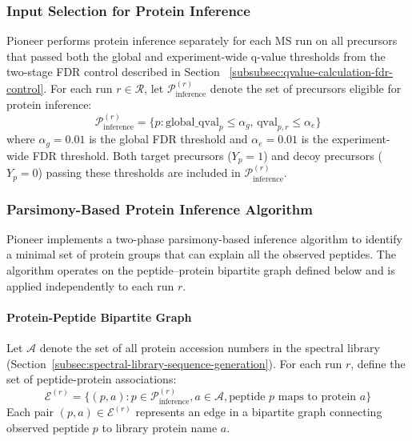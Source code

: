 \documentclass[pdflatex,sn-nature]{sn-jnl}
\begin{document}
\subsubsection{Input Selection for Protein Inference}\label{subsubsec:input-selection-protein-inference}

Pioneer performs protein inference separately for each MS run on all precursors that passed both the global and experiment-wide q-value thresholds from the two-stage FDR control described in Section~ \ref{subsubsec:qvalue-calculation-fdr-control}. For each run $r \in \mathcal{R}$, let $\mathcal{P}_{\text{inference}}^{(r)}$ denote the set of precursors eligible for protein inference:
\begin{equation}
\mathcal{P}_{\text{inference}}^{(r)} = \{p : \text{global\_qval}_p \leq \alpha_g, \, \text{qval}_{p,r} \leq \alpha_e\}
\end{equation}
where $\alpha_g = 0.01$ is the global FDR threshold and $\alpha_e = 0.01$ is the experiment-wide FDR threshold. Both target precursors ($Y_p = 1$) and decoy precursors ($Y_p = 0$) passing these thresholds are included in $\mathcal{P}_{\text{inference}}^{(r)}$.


\subsubsection{Parsimony-Based Protein Inference
Algorithm}\label{subsubsec:parsimony-based-protein-inference}

Pioneer implements a two-phase parsimony-based inference algorithm
\cite{Nesvizhskii2005-oj,Zhang2007-jo} to identify a minimal set of protein groups that can explain all the observed peptides. The algorithm operates on the peptide–protein bipartite graph defined below and is applied independently to each run $r$.

\paragraph{Protein-Peptide Bipartite
Graph}\label{para:protein-peptide-bipartite-graph} Let $\mathcal{A}$ denote the set of all protein accession numbers in the spectral library (Section~\ref{subsec:spectral-library-sequence-generation}). For each run $r$, define the set of peptide-protein associations:
\begin{equation}
\mathcal{E}^{(r)} = \{(p, a) : p \in \mathcal{P}_{\text{inference}}^{(r)},  a
\in \mathcal{A},  \text{peptide } p \text{ maps to protein } a\}
\end{equation}
Each pair $(p, a) \in \mathcal{E}^{(r)}$ represents an edge in a bipartite graph connecting observed peptide $p$ to library protein name $a$.
\end{document}
